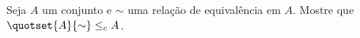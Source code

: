 \begin{exercise}
	Seja $A$ um conjunto e $\sim$ uma relação de equivalência em $A$.
	Mostre que $\quotset{A}{\sim} \leq_c A$.  
\end{exercise}